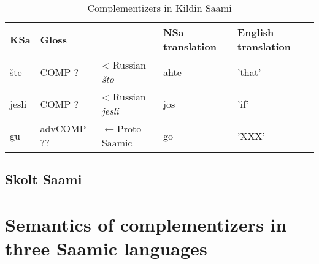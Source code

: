 \documentclass[a4,12pt]{scrartcl}
\begin{document}
\begin{table}[!ht]
\begin{tabular}{l | l l l l}
\hline
\hline
KSa 		& Gloss			&					&NSa translation	& English translation\\
\hline
šte		&{\sc COMP} ?		&< Russian {\it što}		&ahte			&'that'\\
jesli		&{\sc	 COMP} ?		&< Russian {\it jesli}		&jos				&'if'\\
gū		&{\sc advCOMP} ??	&$\leftarrow$Proto Saamic&go				& 'XXX'\\
\hline
\hline
\end{tabular}
\label{KildinComps}
\caption{Complementizers in Kildin Saami}
\end{table}


\subsection{Skolt Saami}


\section{Semantics of complementizers in three Saamic languages}\label{semantics}%
%
\end{document}
